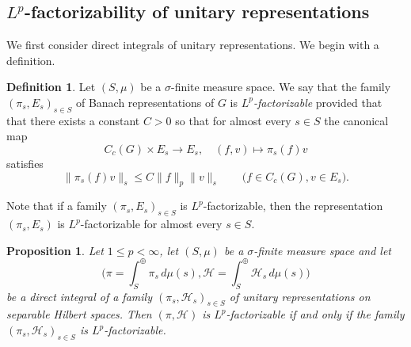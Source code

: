 \documentclass[12pt,letterpaper,titlepage,reqno]{amsart}
\theoremstyle{plain}
\newtheorem{prop}[theorem]{Proposition}
\theoremstyle{definition}
\newtheorem{definition}[theorem]{Definition}
\numberwithin{equation}{section}
\newcommand{\cH}{\mathcal{H}}
\begin{document}
\subsection{$L^p$-factorizability of unitary representations}
We first consider direct integrals of unitary representations.
We begin with a definition.

\begin{definition}
Let $(S, \mu)$ be a $\sigma$-finite measure space.
We say that the family $(\pi_{s}, E_{s})_{s\in S}$ of Banach representations of $G$ is {\em{${L^p}$-factorizable}} provided that that there exists a constant $C>0$ so that for almost every $s\in S$ the canonical map
$$
C_c(G)\times E_{s}\rightarrow E_{s},\quad(f,v)\mapsto \pi_{s}(f)v
$$
satisfies
\begin{equation}\label{eq Estimate pi_s(f)}
\|\pi_{s}(f)v\|_{s}\leq C\|f\|_{p}\|v\|_{s}\qquad\big(f\in C_{c}(G),v\in E_{s}\big).
\end{equation}
\end{definition}

Note that if a family $(\pi_{s}, E_{s})_{s\in S}$ is $L^{p}$-factorizable, then the representation $(\pi_{s}, E_{s})$ is $L^{p}$-factorizable for almost every $s\in S$.

\begin{prop}\label{Prop Direct integral} Let $1\leq p<\infty$, let $(S, \mu)$ be a $\sigma$-finite measure space and let
$$
\Big(\pi=\int^{\oplus}_{S}\pi_{s}\,d\mu(s), \cH=\int^{\oplus}_{S}\cH_{s}\,d\mu(s)\Big)
$$
be a direct integral of a family $(\pi_{s},\cH_{s})_{s\in S}$ of unitary representations on separable Hilbert spaces.
Then $(\pi,\cH)$ is $L^p$-factorizable if and only if the family $(\pi_s, \cH_s)_{s\in S}$ is $L^p$-factorizable. 
\end{prop}
\end{document}
